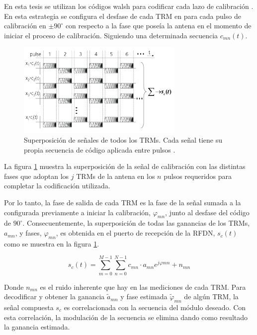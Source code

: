 En esta tesis se utilizan los códigos walsh para codificar cada lazo de calibración \cite{Singhal2012}. En esta estrategia se
configura el desfase de cada TRM en para cada pulso de calibración en $\pm90^{\circ}$ con respecto a la fase que poseía la
antena en el momento de iniciar el proceso de calibración. Siguiendo una determinada secuencia $c_{mn}(t)$.

\begin{figure}
 \centering
 \includegraphics[width=8cm]{gfx/superposition_signals_classic.png}
 \caption{Superposición de señales de todos los TRMs. Cada señal tiene su propia secuencia de código aplicada entre pulsos
 \cite{Br2007}.}
 \label{fig:sup_sign_classic}
\end{figure}

La figura \ref{fig:sup_sign_classic} muestra la superposición de la señal de calibración con las distintas fases que adoptan
los $j$ TRMs de la antena en los $n$ pulsos requeridos para completar la codificación utilizada.

Por lo tanto, la fase de salida de cada TRM es la fase de la señal sumada a la configurada previamente a iniciar la
calibración, $\varphi_{mn}$, junto al desfase del código de $90^{\circ}$. Consecuentemente, la superposición de todas las
ganancias de los TRMs, $a_{mn}$, y fases, $\varphi_{mn}$, es obtenida en el puerto de recepción de la RFDN, $s_c(t)$ como se
muestra en la figura \ref{fig:sup_sign_classic}.

\begin{equation}
	s_c(t) = \sum_{m=0}^{M-1}\sum_{n=0}^{N-1}c_{mn}\cdot a_{mn}e^{j\varphi{mn}} + n_{mn}
\end{equation}

Donde $n_{mn}$ es el ruido inherente que hay en las mediciones de cada TRM. Para decodificar y obtener la ganancia
$\tilde{a}_{mn}$ y fase estimada $\tilde\varphi_{mn}$ de algún TRM, la señal compuesta $s_c$ es correlacionada con
la secuencia del módulo deseado. Con esta correlación, la modulación de la secuencia se elimina dando como resultado
la ganancia estimada.

